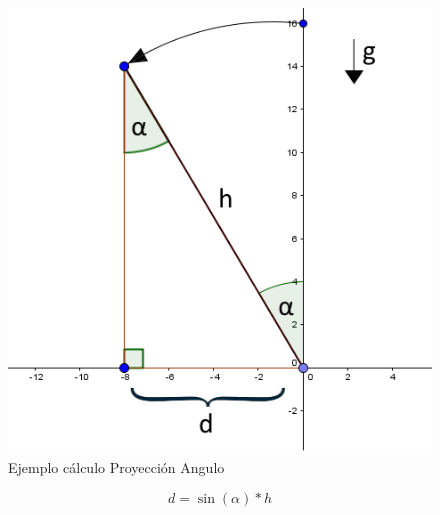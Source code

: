 \documentclass[12pt,a4paper]{article}
\begin{document}
\begin{figure}[H]
	\centering
	\includegraphics[scale=0.5]{images/calculoProyeccion}
	\caption{Ejemplo cálculo Proyección Angulo}
	\label{fig:proyeccion}
\end{figure}

\begin{equation}
	\label{eq:proyeccion}
	d=\sin(\alpha)*h
\end{equation}
\end{document}
